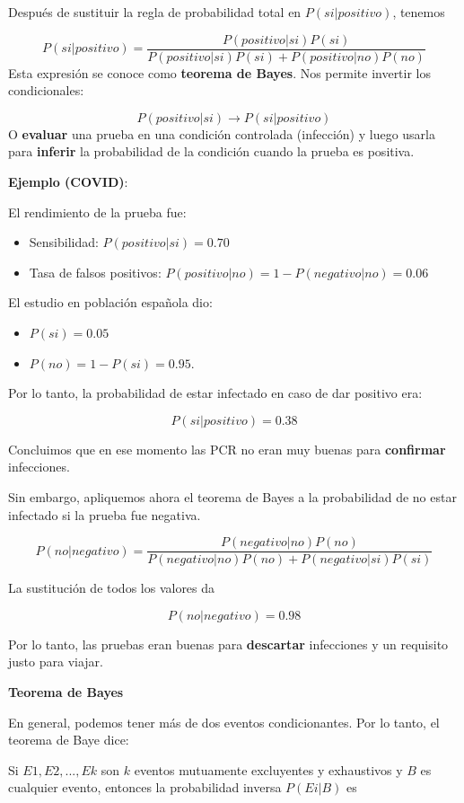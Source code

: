 \documentclass[
]{book}
\providecommand{\tightlist}{%
  \setlength{\itemsep}{0pt}\setlength{\parskip}{0pt}}
\begin{document}
Después de sustituir la regla de probabilidad total en \(P(si|positivo)\), tenemos

\[P(si|positivo)=\frac{P(positivo|si)P(si)}{P(positivo|si)P(si)+P(positivo|no)P(no)}\]
Esta expresión se conoce como \textbf{teorema de Bayes}. Nos permite invertir los condicionales:

\[P(positivo|si) \rightarrow P(si|positivo)\]
O \textbf{evaluar} una prueba en una condición controlada (infección) y luego usarla para \textbf{inferir} la probabilidad de la condición cuando la prueba es positiva.

\textbf{Ejemplo (COVID)}:

El rendimiento de la prueba fue:

\begin{itemize}
\item
  Sensibilidad: \(P(positivo|si)=0.70\)
\item
  Tasa de falsos positivos: \(P(positivo|no)=1- P(negativo|no)=0.06\)
\end{itemize}

El estudio en población española dio:

\begin{itemize}
\tightlist
\item
  \(P(si)=0.05\)
\item
  \(P(no)=1-P(si)=0.95\).
\end{itemize}

Por lo tanto, la probabilidad de estar infectado en caso de dar positivo era:

\[P(si|positivo)=0.38\]

Concluimos que en ese momento las PCR no eran muy buenas para \textbf{confirmar} infecciones.

Sin embargo, apliquemos ahora el teorema de Bayes a la probabilidad de no estar infectado si la prueba fue negativa.

\[P(no|negativo) = \frac{P(negativo|no) P(no)}{P(negativo|no) P(no)+P(negativo|si)P(si)}\]

La sustitución de todos los valores da

\[P(no|negativo)=0.98\]

Por lo tanto, las pruebas eran buenas para \textbf{descartar} infecciones y un requisito justo para viajar.

\textbf{Teorema de Bayes}

En general, podemos tener más de dos eventos condicionantes. Por lo tanto, el teorema de Baye dice:

Si \(E1, E2, ..., Ek\) son \(k\) eventos mutuamente excluyentes y exhaustivos y \(B\) es cualquier evento, entonces la probabilidad inversa \(P(Ei|B)\) es
\end{document}
